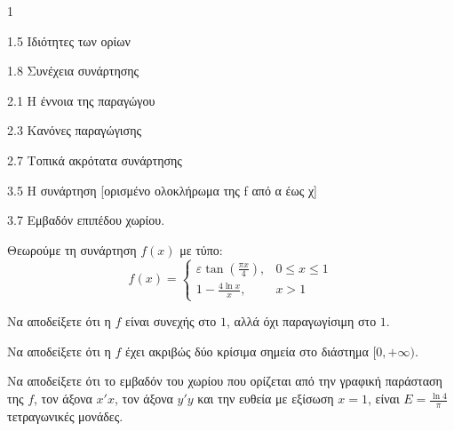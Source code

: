 \begin{ylh}{1}
    \item 1.5 Ιδιότητες των ορίων
    \item 1.8 Συνέχεια συνάρτησης
    \item 2.1 Η έννοια της παραγώγου
    \item 2.3 Κανόνες παραγώγισης
    \item 2.7 Τοπικά ακρότατα συνάρτησης
    \item 3.5 Η συνάρτηση [ορισμένο ολοκλήρωμα της f από α έως χ]
    \item 3.7 Εμβαδόν επιπέδου χωρίου.
\end{ylh}
Θεωρούμε τη συνάρτηση $f(x)$ με τύπο:
\[ f(x) = \begin{cases} \varepsilon \tan\left(\frac{\pi x}{4}\right), & 0 \le x \le 1 \\ 1 - \frac{4\ln x}{x}, & x > 1 \end{cases} \]
\begin{alist}
\item Να αποδείξετε ότι η $f$ είναι συνεχής στο $1$, αλλά όχι παραγωγίσιμη στο $1$. 
\item Να αποδείξετε ότι η $f$ έχει ακριβώς δύο κρίσιμα σημεία στο διάστημα $[0, +\infty)$. 
\item Να αποδείξετε ότι το εμβαδόν του χωρίου που ορίζεται από την γραφική παράσταση της $f$, τον άξονα $x'x$, τον άξονα $y'y$ και την ευθεία με εξίσωση $x = 1$, είναι $E = \frac{\ln 4}{\pi}$ τετραγωνικές μονάδες. 
\end{alist}